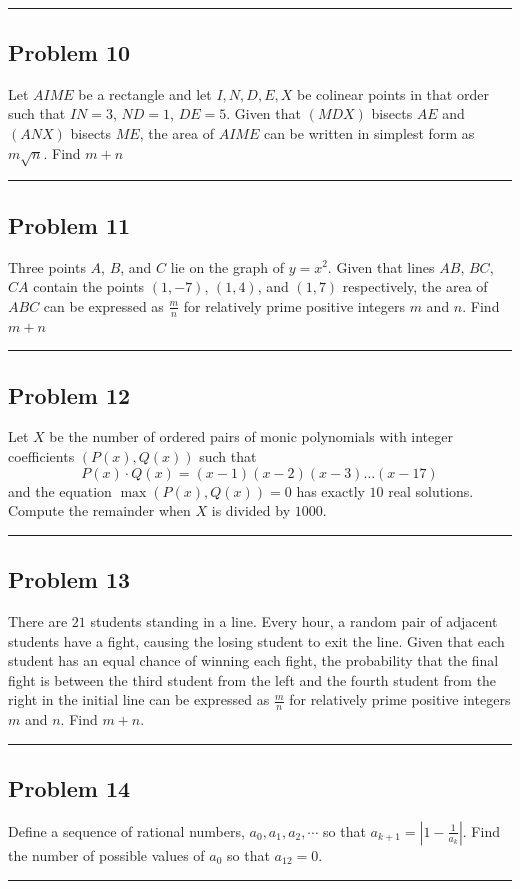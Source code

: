 \documentclass[10pt]{scrartcl}\usepackage[utf8]{inputenc}\usepackage{amsmath}\usepackage{amsfonts} \usepackage{tikz}\usepackage{asymptote}\usepackage[most]{tcolorbox}\usepackage{fancyhdr}\usepackage{geometry}\usepackage{color}\usepackage{lewis}\usepackage[T1]{fontenc}\usepackage[explicit]{titlesec}\usepackage{fontawesome}\usepackage{sansmathfonts}\pagestyle{fancy}
\begin{document}
\\
\noindent\rule{14.5cm}{0.8pt}
\subsection*{Problem 10}
Let $AIME$ be a rectangle and let $I,N,D,E,X$ be colinear points in that order such that $IN = 3$, $ND=1$, $DE=5$. Given that $(MDX)$ bisects $AE$ and $(ANX)$ bisects $ME$, the area of $AIME$ can be written in simplest form as $m\sqrt{n}$. Find $m+n$
\\
\noindent\rule{14.5cm}{0.8pt}
\subsection*{Problem 11}

Three points $A$, $B$, and $C$ lie on the graph of $y=x^2$. Given that lines $AB$, $BC$, $CA$ contain the points $(1, -7)$, $(1, 4)$, and $(1, 7)$ respectively, the area of $ABC$ can be expressed as $\frac{m}{n}$ for relatively prime positive integers $m$ and $n$. Find $m+n$
\\
\noindent\rule{14.5cm}{0.8pt}
\subsection*{Problem 12}
Let $X$ be the number of ordered pairs of monic polynomials with integer coefficients  $\left(P(x), Q(x)\right)$ such that $$P(x)\cdot{}Q(x) = (x-1)(x-2)(x-3)\dots(x-17)$$ and the equation $\max(P(x), Q(x))=0$ has exactly $10$ real solutions. Compute the remainder when $X$ is divided by $1000$.
\\
\noindent\rule{14.5cm}{0.8pt}
\subsection*{Problem 13}
There are $21$ students standing in a line. Every hour, a random pair of adjacent students have a fight, causing the losing student to exit the line. Given that each student has an equal chance of winning each fight, the probability that the final fight is between the third student from the left and the fourth student from the right in the initial line can be expressed as $\tfrac{m}{n}$ for relatively prime positive integers $m$ and $n$. Find $m+n$.
\\
\noindent\rule{14.5cm}{0.8pt}
\subsection*{Problem 14}
Define a sequence of rational numbers,  \(a_0, a_1, a_2, \cdots\) so that \(a_{k+1} = |1-\frac{1}{a_k}|\). Find the number of possible values of \(a_0\) so that \(a_{12}=0\).
\\
\noindent\rule{14.5cm}{0.8pt}
\end{document}
